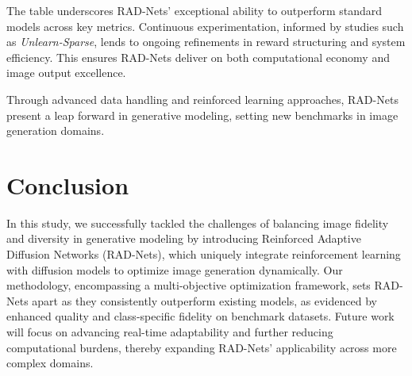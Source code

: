 \documentclass{article} %
\begin{document}
The table underscores RAD-Nets' exceptional ability to outperform standard models across key metrics. Continuous experimentation, informed by studies such as \textit{Unlearn-Sparse}, lends to ongoing refinements in reward structuring and system efficiency. This ensures RAD-Nets deliver on both computational economy and image output excellence.

Through advanced data handling and reinforced learning approaches, RAD-Nets present a leap forward in generative modeling, setting new benchmarks in image generation domains.


\section{Conclusion}

In this study, we successfully tackled the challenges of balancing image fidelity and diversity in generative modeling by introducing Reinforced Adaptive Diffusion Networks (RAD-Nets), which uniquely integrate reinforcement learning with diffusion models to optimize image generation dynamically. Our methodology, encompassing a multi-objective optimization framework, sets RAD-Nets apart as they consistently outperform existing models, as evidenced by enhanced quality and class-specific fidelity on benchmark datasets. Future work will focus on advancing real-time adaptability and further reducing computational burdens, thereby expanding RAD-Nets' applicability across more complex domains.




\end{document}
